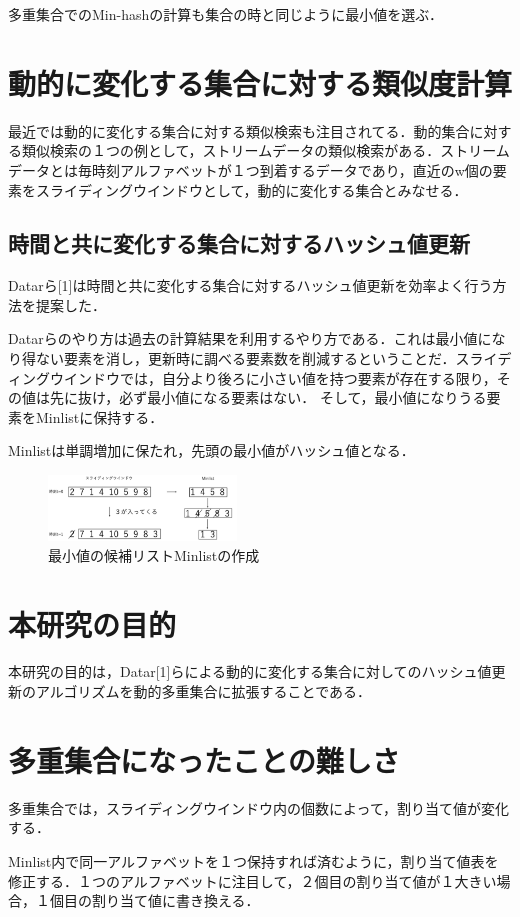 \documentclass[a4j,twocolumn,dvipdfmx,autodetect-engine]{jsarticle}
\begin{document}
多重集合でのMin-hashの計算も集合の時と同じように最小値を選ぶ．

\section{動的に変化する集合に対する類似度計算}
最近では動的に変化する集合に対する類似検索も注目されてる．動的集合に対する類似検索の１つの例として，ストリームデータの類似検索がある．ストリームデータとは毎時刻アルファベットが１つ到着するデータであり，直近のw個の要素をスライディングウインドウとして，動的に変化する集合とみなせる．


\subsection{時間と共に変化する集合に対するハッシュ値更新}
Datarら[1]は時間と共に変化する集合に対するハッシュ値更新を効率よく行う方法を提案した．

Datarらのやり方は過去の計算結果を利用するやり方である．これは最小値になり得ない要素を消し，更新時に調べる要素数を削減するということだ．スライディングウインドウでは，自分より後ろに小さい値を持つ要素が存在する限り，その値は先に抜け，必ず最小値になる要素はない．
そして，最小値になりうる要素をMinlistに保持する．

Minlistは単調増加に保たれ，先頭の最小値がハッシュ値となる．

\begin{figure}[H]
  \centering
  \includegraphics[width=5cm]{Minlist.png}
  \caption{最小値の候補リストMinlistの作成}
\end{figure}

\section{本研究の目的}
本研究の目的は，Datar[1]らによる動的に変化する集合に対してのハッシュ値更新のアルゴリズムを動的多重集合に拡張することである．

\section{多重集合になったことの難しさ}
多重集合では，スライディングウインドウ内の個数によって，割り当て値が変化する．

Minlist内で同一アルファベットを１つ保持すれば済むように，割り当て値表を修正する．１つのアルファベットに注目して，２個目の割り当て値が１大きい場合，１個目の割り当て値に書き換える．
\end{document}
